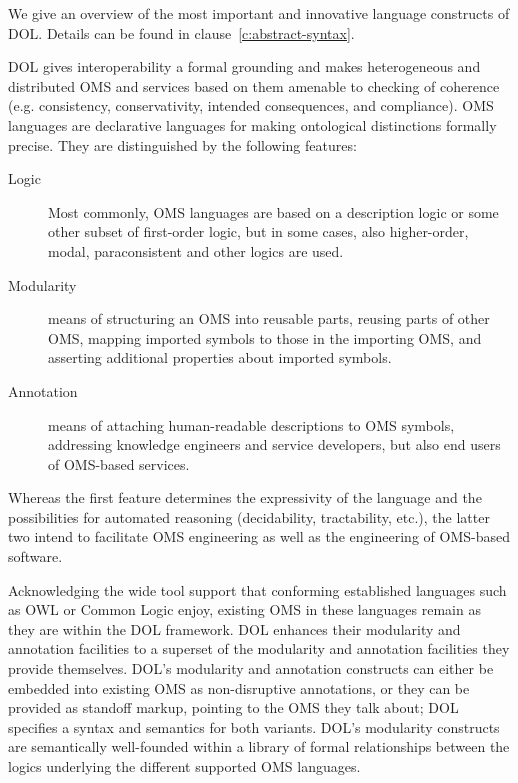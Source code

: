 \documentclass[10pt,%
\ifpretendfinal
final%
\else
draft%
\fi,
]{scrreprt}
\makeatletter
\newcommand*\CommentAuthor{}
\renewcommand*\CommentAuthor{#1}}
\newcommand*\CommentDate{}
\renewcommand*\CommentDate{#1}}
\newcommand*\CommentId{}
\renewcommand*\CommentId{#1}}
\newcommand*\CommentType{}
\renewcommand*\CommentType{#1}}
\newcommand*{\SetCommentColorByType}[1]{%
\edef\localType{{#1}}%
\expandafter\ifstrequal\localType{q-aut}{\colorlet{CommentColor}{red}}{%
\expandafter\ifstrequal\localType{q-all}{\colorlet{CommentColor}{orange}}{%
\expandafter\ifstrequal\localType{todo}{\colorlet{CommentColor}{orange}}{%
\expandafter\ifstrequal\localType{fyi}{\colorlet{CommentColor}{lightgray}}{%
\colorlet{CommentColor}{yellow}}}}}}
\newcommand*{\SetCommentPrefixByType}[1]{%
\edef\localType{{#1}}%
\expandafter\@ifmtarg\localType{%
\edef\CommentPrefix{}%
}{%
\caseupper[q]{#1}%
\edef\CommentPrefix{\thestring: }%
}}
\newcommand*{\initComment}[1]{%
\setkeys{Comment}{#1}%
\SetCommentColorByType{\CommentType}%
\relax%
\SetCommentPrefixByType{\CommentType}%
\relax%
}
\newcommand*{\todonote}[2][]{%
\initComment{#1}%
\pdfcomment[author=\CommentAuthor,color=CommentColor,date=\CommentDate,id=\CommentId]{%
\CommentPrefix
#2}}
\renewcommand*{\todonote}[2][]{%
\initComment{#1}%
\ednote{\CommentPrefix #2}}
\makeatother
\begin{document}
%
%
\label{c:design:overview}
%
We give an overview of the most important and innovative language
constructs of DOL. Details can be found in clause~\ref{c:abstract-syntax}.


DOL gives interoperability a formal grounding and makes heterogeneous and distributed OMS and services based on them amenable to checking of coherence (e.g. consistency, conservativity, intended consequences, and compliance). OMS languages are declarative languages for making ontological distinctions formally precise. They are distinguished by the following features:

\begin{description}
\item[Logic] Most commonly, OMS languages are based on a description logic or some other subset of first-order logic, but in some cases, also higher-order, modal, paraconsistent and other logics are used.
\item[Modularity] means of structuring an OMS into reusable parts, reusing parts of other OMS, mapping imported symbols to those in the importing OMS, and asserting additional properties about imported symbols.
\item[Annotation] means of attaching human-readable descriptions to OMS symbols, addressing knowledge engineers and service developers, but also end users of OMS-based services.
\end{description}
Whereas the first feature determines the expressivity of the language and the possibilities for automated reasoning (decidability, tractability, etc.), the latter two intend to facilitate OMS engineering as well as the engineering of OMS-based software.

Acknowledging the wide tool support that conforming established languages such as OWL or Common Logic enjoy, existing OMS in these languages remain as they are within the DOL framework. DOL enhances their modularity and annotation facilities to a superset of the modularity and annotation facilities they provide themselves. DOL's modularity and annotation constructs can either be embedded into existing OMS as non-disruptive annotations, or they can be provided as standoff markup, pointing to the OMS they talk about; DOL specifies a syntax and semantics for both variants. DOL's modularity constructs are semantically well-founded within a library of formal relationships between the logics underlying the different supported OMS languages.
\end{document}
